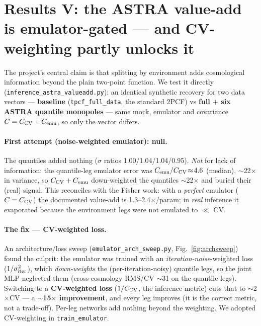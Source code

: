 \documentclass[11pt]{article}
\newcommand{\code}[1]{\texttt{#1}}
\begin{document}
\section{Results V: the ASTRA value-add is emulator-gated --- and CV-weighting
partly unlocks it}
The project's central claim is that splitting by environment adds cosmological
information beyond the plain two-point function. We test it directly
(\code{inference\_astra\_valueadd.py}): an identical synthetic recovery for two data
vectors --- \textbf{baseline} (\code{tpcf\_full\_data}, the standard 2PCF) vs
\textbf{full $+$ six ASTRA quantile monopoles} --- same mock, emulator and covariance
$C=C_{\rm CV}+C_{\rm emu}$, so only the vector differs.

\paragraph{First attempt (noise-weighted emulator): null.} The quantiles added
nothing ($\sigma$ ratios 1.00/1.04/1.04/0.95). \emph{Not} for lack of information:
the quantile-leg emulator error was $C_{\rm emu}/C_{\rm CV}\!\approx\!4.6$ (median),
$\sim$22$\times$ in variance, so $C_{\rm CV}+C_{\rm emu}$ down-weighted the quantiles
$\sim$22$\times$ and buried their (real) signal. This reconciles with the Fisher work:
with a \emph{perfect} emulator ($C=C_{\rm CV}$) the documented value-add is
1.3--2.4$\times$/param; in \emph{real} inference it evaporated because the environment
legs were not emulated to $\ll$ CV.

\paragraph{The fix --- CV-weighted loss.} An architecture/loss sweep
(\code{emulator\_arch\_sweep.py}, Fig.~\ref{fig:archsweep}) found the culprit: the
emulator was trained with an \emph{iteration-noise}-weighted loss ($1/\sigma_{\rm
iter}^2$), which \emph{down-weights} the (per-iteration-noisy) quantile legs, so the
joint MLP neglected them (cross-cosmology RMS/CV $\sim$31 on the quantile legs).
Switching to a \textbf{CV-weighted loss} ($1/C_{\rm CV}$, the inference metric) cuts
that to $\sim$2$\times$CV --- a \textbf{$\sim$15$\times$ improvement}, and every leg
improves (it is the correct metric, not a trade-off). Per-leg networks add nothing
beyond the weighting. We adopted CV-weighting in \code{train\_emulator}.
\end{document}
